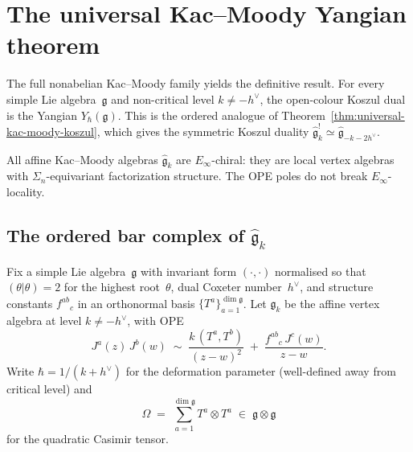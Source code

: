 \section{The universal Kac--Moody Yangian theorem}
\label{sec:km-yangian}

The full nonabelian Kac--Moody family yields the definitive result. For every simple Lie algebra~$\mathfrak{g}$
and non-critical level $k\neq -h^\vee$, the open-colour Koszul
dual is the Yangian $Y_\hbar(\mathfrak{g})$. This is the
ordered analogue of Theorem~\ref{thm:universal-kac-moody-koszul},
which gives the symmetric Koszul duality
$\widehat{\mathfrak{g}}_k^!\simeq
\widehat{\mathfrak{g}}_{-k-2h^\vee}$.

All affine Kac--Moody algebras $\widehat{\mathfrak{g}}_k$ are
$E_\infty$-chiral: they are local vertex algebras with
$\Sigma_n$-equivariant factorization structure. The OPE poles
do not break $E_\infty$-locality.

\subsection{The ordered bar complex of
$\widehat{\mathfrak{g}}_k$}
\label{subsec:km-ordered-bar}

Fix a simple Lie algebra~$\mathfrak{g}$ with invariant form
$(\cdot,\cdot)$ normalised so that $(\theta|\theta)=2$
for the highest root~$\theta$, dual Coxeter number~$h^\vee$,
and structure constants $f^{ab}{}_{c}$ in an orthonormal basis
$\{T^a\}_{a=1}^{\dim\mathfrak{g}}$.
Let $\widehat{\mathfrak{g}}_k$ be the affine vertex algebra at
level $k\neq -h^\vee$, with OPE
\begin{equation}\label{eq:km-ope-ordered}
J^a(z)\,J^b(w)
\;\sim\;
\frac{k\,(T^a,T^b)}{(z-w)^2}
\;+\;
\frac{f^{ab}{}_{c}\,J^c(w)}{z-w}.
\end{equation}
Write $\hbar = 1/(k+h^\vee)$ for the deformation parameter
(well-defined away from critical level) and
\[
\Omega
\;=\;
\sum_{a=1}^{\dim\mathfrak{g}} T^a\otimes T^a
\;\in\;
\mathfrak{g}\otimes\mathfrak{g}
\]
for the quadratic Casimir tensor.

